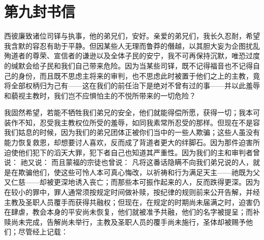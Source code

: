 
\section{第九封书信}

\par

\par

西彼廉致诸位司铎与执事，他的弟兄们，安好。亲爱的弟兄们，我长久忍耐，希望我含默的容忍有助于平静。但因某些人无理而鲁莽的僭越，以其胆大妄为企图扰乱殉道者的尊荣、宣信者的谦逊以及全体子民的安宁，我不可再保持沉默，唯恐过度的缄默会给子民和我们自己带来危险。因为当某些司铎，既不记得福音也不记得自己的身份，而且既不思虑主将来的审判，也不思虑此时被置于他们之上的主教，竟将全部权柄归为己有——这在我们的前任治下是绝对不曾有过的事——并以此羞辱和藐视主教时，我们岂不应惧怕主的不悦所带来的一切危险？\par

我固然希望，若能不牺牲我们弟兄的安全，他们就能得偿所愿，获得一切；我本可装作不知，忍受我主教权位所受的羞辱，如同我素常所忍受的那样。但现在不是容我们姑息的时候，因为我们的弟兄团体正被你们当中的一些人欺骗；这些人虽没有能力恢复救恩，却想要讨人喜欢，反而成了背道者更大的绊脚石。因为那件迫害所迫使他们犯下的滔天大罪，犯下者自己也知道其严重性。因为我们的主和审判者曾说：  祂又说：  而且蒙福的宗徒也曾说：  凡将这番话隐瞒不向我们弟兄说的人，就是在欺骗他们，使这些可怜人本可真心悔改，以祈祷和行为满足天主——祂既为父又仁慈——却被更深地诱入丧亡；而那些本可振作起来的人，反而跌得更深。因为在较小的罪中，罪人通常须按规定时间做补赎，按纪律的规则前来公开告解，并经主教及圣职人员覆手而获得共融权；但现在，在规定的时期尚未届满之时，迫害仍在肆虐，教会本身的平安尚未恢复，他们就被准予共融，他们的名字被提呈；而补赎尚未完成，告解尚未举行，主教及圣职人员的覆手尚未施行，圣体却被赐予他们；尽管经上记载： \par

